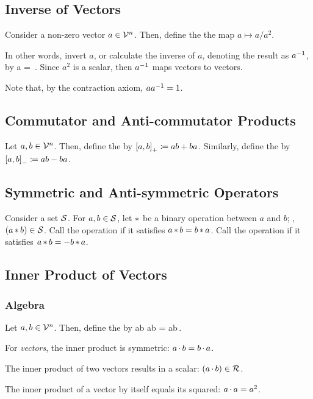 \subsection{Inverse of Vectors}
Consider a non-zero vector $a\in\mathcal{V}^{n}$. Then, define the  the map $a\mapsto a/a^2$. 

In other words, invert $a$, or calculate the inverse of $a$, denoting the result as ${a}^{-1}$, by
\beq
\inv a =   {}\,.
\eeq
Since $a^2$ is a scalar, then ${a}^{-1}$ maps vectors to vectors.

Note that, by the contraction axiom, $a{a}^{-1} = 1$.


\subsection{Commutator and Anti-commutator Products}
Let $a,b\in\mathcal{V}^{n}$. Then, define the  by $\left[{a},{b}\right]_{+}\coloneqq{a}{b} + {b}{a}$. Similarly, define the  by $\left[{a},{b}\right]_{-}\coloneqq{a}{b} - {b}{a}$.


\subsection{Symmetric and Anti-symmetric Operators}
Consider a set $\mathcal{S}$. For $a, b\in\mathcal{S}$, let $\operatorname{\ast}$ be a binary operation between $a$ and $b$; \ie, $(a\operatorname{\ast} b)\in\mathcal{S}$. Call the operation  if it satisfies $a\operatorname{\ast} b = b\operatorname{\ast} a$. Call the operation  if it satisfies $a\operatorname{\ast} b = -b\operatorname{\ast} a$.


\subsection{Inner Product of Vectors}

\subsubsection{Algebra}
Let $a, b\in\mathcal{V}^{n}$. Then, define the  by
\beq
a\iprod b  \acom ab = \xacom ab\,.
\eeq

For \emph{vectors}, the inner product is symmetric: $a\operatorname{\cdot} b = b\operatorname{\cdot} a$.

The inner product of two vectors results in a scalar: $(a\operatorname{\cdot} b)\in\mathcal{R}$.

The inner product of a vector by itself equals its squared: $a\operatorname{\cdot} a = a^2$.

